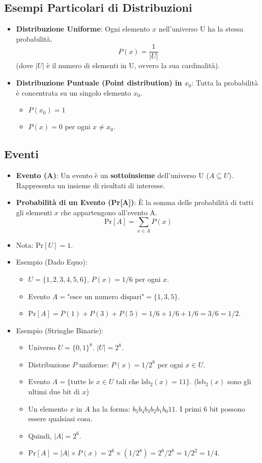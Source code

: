 \subsection{Esempi Particolari di Distribuzioni}
\begin{itemize}
    \item \textbf{Distribuzione Uniforme}: Ogni elemento $x$ nell'universo U ha la stessa probabilità.
    \[ P(x) = \frac{1}{|U|} \]
    (dove $|U|$ è il numero di elementi in U, ovvero la sua cardinalità).
    \item \textbf{Distribuzione Puntuale (Point distribution) in $x_0$}: Tutta la probabilità è concentrata su un singolo elemento $x_0$.
    \begin{itemize}
        \item $P(x_0) = 1$
        \item $P(x) = 0$ per ogni $x \neq x_0$.
    \end{itemize}
\end{itemize}

\subsection{Eventi}
\begin{itemize}
    \item \textbf{Evento (A)}: Un evento è un \textbf{sottoinsieme} dell'universo U ($A \subseteq U$). Rappresenta un insieme di risultati di interesse.
    \item \textbf{Probabilità di un Evento (Pr[A])}: È la somma delle probabilità di tutti gli elementi $x$ che appartengono all'evento A.
    \[ \text{Pr}[A] = \sum_{x \in A} P(x) \]
    \item Nota: $\text{Pr}[U] = 1$.
    \item Esempio (Dado Equo):
    \begin{itemize}
        \item $U = \{1, 2, 3, 4, 5, 6\}$, $P(x) = 1/6$ per ogni $x$.
        \item Evento $A = \text{"esce un numero dispari"} = \{1, 3, 5\}$.
        \item $\text{Pr}[A] = P(1) + P(3) + P(5) = 1/6 + 1/6 + 1/6 = 3/6 = 1/2$.
    \end{itemize}
    \item Esempio (Stringhe Binarie):
    \begin{itemize}
        \item Universo $U = \{0,1\}^8$. $|U| = 2^8$.
        \item Distribuzione $P$ uniforme: $P(x) = 1/2^8$ per ogni $x \in U$.
        \item Evento $A = \{ \text{tutte le } x \in U \text{ tali che lsb}_2(x)=11 \}$. (lsb$_2(x)$ sono gli ultimi due bit di $x$)
        \item Un elemento $x$ in $A$ ha la forma: $b_5 b_4 b_3 b_2 b_1 b_0 1 1$. I primi 6 bit possono essere qualsiasi cosa.
        \item Quindi, $|A| = 2^6$.
        \item $\text{Pr}[A] = |A| \times P(x) = 2^6 \times (1/2^8) = 2^6 / 2^8 = 1/2^2 = 1/4$.
    \end{itemize}
\end{itemize}

